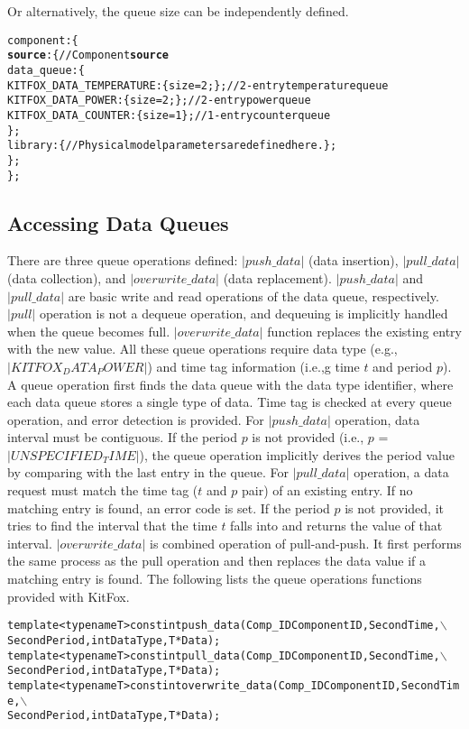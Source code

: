 \noindent
Or alternatively, the queue size can be independently defined.
{
\fontsize{10pt}{11pt}\selectfont
\begin{alltt}
component: \{
   {\bf source}: \{ // Component {\bf source}
        data_queue: \{
            KITFOX_DATA_TEMPERATURE: \{ size = 2; \}; // 2-entry temperature queue
            KITFOX_DATA_POWER: \{ size = 2; \}; // 2-entry power queue
            KITFOX_DATA_COUNTER: \{ size = 1 \}; // 1-entry counter queue
        \};
        library: \{ // Physical model parameters are defined here. \};
    \};
\};
\end{alltt}
}

\subsection{Accessing Data Queues} \label{subsec:accessing_data_queues}
\noindent
There are three queue operations defined: $|push\_data|$ (data insertion), $|pull\_data|$ (data collection), and $|overwrite\_data|$ (data replacement). 
$|push\_data|$ and $|pull\_data|$ are basic write and read operations of the data queue, respectively. 
$|pull|$ operation is not a dequeue operation, and dequeuing is implicitly handled when the queue becomes full. 
$|overwrite\_data|$ function replaces the existing entry with the new value. 
All these queue operations require data type (e.g., $|KITFOX_DATA_POWER|$) and time tag information (i.e.,g time $t$ and period $p$). 
A queue operation first finds the data queue with the data type identifier, where each data queue stores a single type of data. 
Time tag is checked at every queue operation, and error detection is provided. 
For $|push\_data|$ operation, data interval must be contiguous. 
If the period $p$ is not provided (i.e., $p$ = $|UNSPECIFIED_TIME|$), the queue operation implicitly derives the period value by comparing with the last entry in the queue. 
For $|pull\_data|$ operation, a data request must match the time tag ($t$ and $p$ pair) of an existing entry. 
If no matching entry is found, an error code is set. 
If the period $p$ is not provided, it tries to find the interval that the time $t$ falls into and returns the value of that interval. 
$|overwrite\_data|$ is combined operation of pull-and-push. 
It first performs the same process as the pull operation and then replaces the data value if a matching entry is found. 
The following lists the queue operations functions provided with KitFox.
{
\fontsize{10pt}{11pt}\selectfont
\begin{alltt}
template <typename T> const int push_data(Comp_ID ComponentID, Second Time,\(\backslash\)
                      Second Period, int DataType, T *Data);
template <typename T> const int pull_data(Comp_ID ComponentID, Second Time,\(\backslash\)
                      Second Period, int DataType, T *Data);
template <typename T> const int overwrite_data(Comp_ID ComponentID, Second Time,\(\backslash\)
                      Second Period, int DataType, T *Data);
\end{alltt}
}

